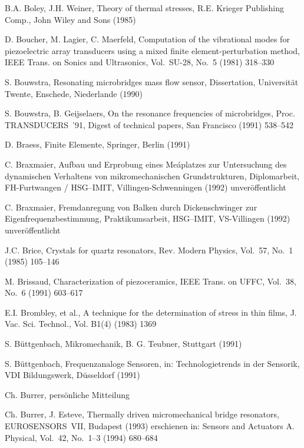 \begin{thebibliography}{xxx}
 B.A. Boley, J.H. Weiner, Theory of thermal stresses, R.E. Krieger Publishing
 Comp., John Wiley and Sons (1985)

 D. Boucher, M. Lagier, C. Maerfeld, Computation of the vibrational modes
 for piezoelectric array transducers using a mixed finite
 element-perturbation method, IEEE Trans. on Sonics and Ultrasonics,
 Vol.~SU-28, No.~5 (1981) 318--330

 S. Bouwstra, Resonating microbridges mass flow sensor, Dissertation,
 Universität Twente, Enschede, Niederlande (1990)

 S. Bouwstra, B. Geijselaers, On the resonance frequencies of microbridges,
 Proc. TRANSDUCERS~'91, Digest of technical papers, San Francisco
 (1991) 538--542

 D. Braess, Finite Elemente, Springer, Berlin (1991)

 C. Braxmaier, Aufbau und Erprobung eines Meáplatzes zur Untersuchung des
 dynamischen Verhaltens von mikromechanischen Grundstrukturen,
 Diplomarbeit, FH-Furtwangen / HSG--IMIT, Villingen-Schwenningen (1992)
 unveröffentlicht

 C. Braxmaier, Fremdanregung von Balken durch Dickenschwinger zur
 Eigenfrequenzbestimmung, Praktikumsarbeit, HSG--IMIT, VS-Villingen (1992)
 unveröffentlicht

 J.C. Brice, Crystals for quartz resonators, Rev. Modern Physics,
 Vol.~57, No.~1 (1985) 105--146

 M. Brissaud, Characterization of piezoceramics, IEEE Trans. on UFFC,
 Vol.~38, No.~6 (1991) 603--617

 E.I. Brombley, et al., A technique for the determination of stress in thin
 films, J. Vac. Sci. Technol., Vol. B1(4) (1983) 1369

 S. Büttgenbach, Mikromechanik, B. G. Teubner, Stuttgart (1991)

 S. Büttgenbach, Frequenzanaloge Sensoren, in: Technologietrends in der
 Sensorik, VDI Bildungswerk, Düsseldorf (1991)

 Ch. Burrer, persönliche Mitteilung

 Ch. Burrer, J. Esteve, Thermally driven micromechanical bridge resonators,
 EUROSENSORS~VII, Budapest (1993) erschienen in: Sensors and Actuators A.
 Physical, Vol.~42, No.~1--3 (1994) 680--684


\end{thebibliography}
